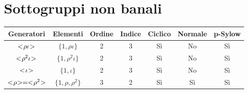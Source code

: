\section{Sottogruppi non banali}
\label{sec:d3_sottogruppi_non_banali}

\begin{center}
	\begin{tabular}{ccccccc}
		\toprule
		Generatori & Elementi & Ordine & Indice & Ciclico & Normale & p-Sylow \\
		\midrule
		$< \negmedspace \rho\iota \negmedspace >$ & $\{1, \rho\iota\}$ & 2 & 3 & Sì & No & Sì \\
		$< \negmedspace \rho^2\iota \negmedspace >$ & $\{1, \rho^2\iota\}$ & 2 & 3 & Sì & No & Sì \\
		$< \negmedspace \iota \negmedspace >$ & $\{1, \iota\}$ & 2 & 3 & Sì & No & Sì \\
		$< \negmedspace \rho \negmedspace > = < \negmedspace \rho^2 \negmedspace >$ & $\{1, \rho, \rho^2\}$ & 3 & 2 & Sì & Sì & Sì \\
		\bottomrule
	\end{tabular}
\end{center}


